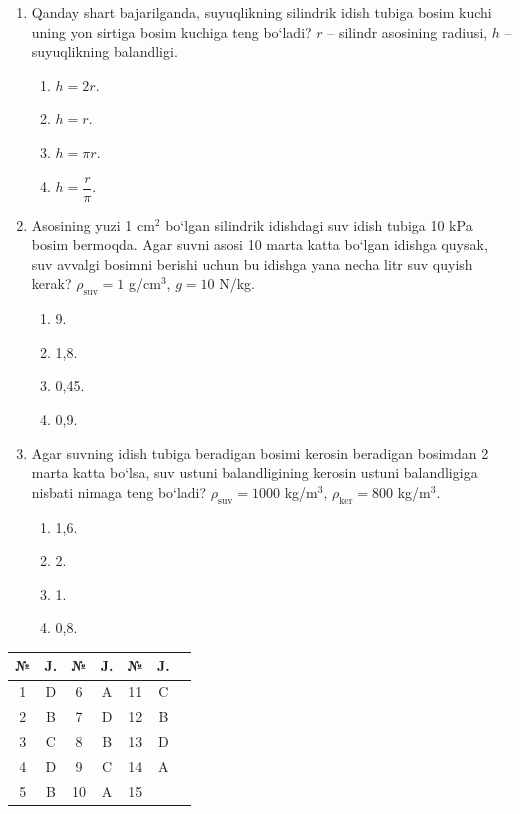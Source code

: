 \begin{enumerate}
\begin{enumerate}[label=\Alph*)]
\item 0,5.
\item 0,1.
\item 0,05.
\item 0,8.
\end{enumerate}


\item Qanday shart bajarilganda, suyuqlikning silindrik idish tubiga bosim kuchi uning yon sirtiga bosim kuchiga teng bo‘ladi? $r$ – silindr asosining radiusi, $h$ – suyuqlikning balandligi.

\begin{enumerate}[label=\Alph*)]
\item $h=2r$.
\item $h=r$.
\item $h=\pi r$.
\item $h=\dfrac{r}{\pi}$.
\end{enumerate}


\item Asosining yuzi 1 cm$^2$ bo‘lgan silindrik idishdagi suv idish tubiga 10 kPa bosim bermoqda. Agar suvni asosi 10 marta katta bo‘lgan idishga quysak, suv avvalgi bosimni berishi uchun bu idishga yana necha litr suv quyish kerak? $\rho_{\text{suv}}=1$ g/cm$^3$, $g=10$ N/kg.

\begin{enumerate}[label=\Alph*)]
\item 9.
\item 1,8.
\item 0,45.
\item 0,9.
\end{enumerate}


\item Agar suvning idish tubiga beradigan bosimi kerosin beradigan bosimdan 
2 marta katta bo‘lsa, suv ustuni balandligining kerosin ustuni balandligiga 
nisbati nimaga teng bo‘ladi? $\rho_{\text{suv}}=1000$ kg/m$^3$, 
$\rho_{\text{ker}}=800$ kg/m$^3$.

\begin{enumerate}[label=\Alph*)]
\item 1,6.
\item 2.
\item 1.
\item 0,8.

\end{enumerate}



\end{enumerate}


\begin{table}[h!]
\centering
\begin{tabular}{|c|c|c|c|c|c|c|}
\hline
№ & J. & № & J. & № & J.  \\ \hline
1 & D & 6 & A & 11 & C \\ \hline
2 & B & 7 & D & 12 & B \\ \hline
3 & C & 8 & B & 13 & D \\ \hline
4 & D & 9 & C & 14 & A  \\ \hline
5 & B & 10 & A & 15 &   \\ \hline
\end{tabular}
\end{table}